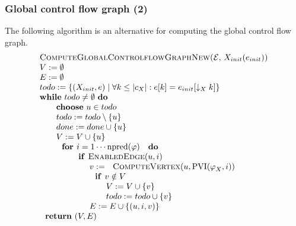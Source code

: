 \subsubsection{Global control flow graph (2)}

The following algorithm is an alternative for computing the global control
flow graph.%
\begin{equation*}
\begin{tabular}{l}
\textsc{ComputeGlobalControlflowGraphNew(}$\mathcal{E}$, $X_{init}(e_{init})$%
\textsc{)} \\ 
$V:=\emptyset $ \\ 
$E:=\emptyset $ \\ 
$todo:=\{(X_{init},e)\mid \forall k\leq \left\vert c_{X}\right\vert
:e[k]=e_{init}[\downarrow _{X}k]\}$ \\ 
\textbf{while} $todo\neq \emptyset $ \textbf{do} \\ 
$\qquad $\textbf{choose} $u\in todo$ \\ 
$\qquad todo:=todo\setminus \{u\}$ \\ 
$\qquad done:=done\cup \{u\}$ \\ 
$\qquad V:=V\cup \{u\}$ \\ 
$\qquad \text{\textbf{for }}i=1\cdots \mathrm{npred}(\varphi )\text{ \textbf{%
do}}$ \\ 
$\qquad \qquad \text{\textbf{if }\textsc{EnabledEdge}}(u,i)$ \\ 
$\qquad \qquad \qquad v:=\text{\textsc{ComputeVertex}}(u,\mathrm{PVI}%
(\varphi _{X},i))$ \\ 
$\qquad \qquad \qquad \text{\textbf{if }}v\notin V$ \\ 
$\qquad \qquad \qquad \qquad V:=V\cup \{v\}$ \\ 
$\qquad \qquad \qquad \qquad todo:=todo\cup \{v\}$ \\ 
$\qquad \qquad \qquad E:=E\cup \{(u,i,v)\}$ \\ 
$\text{\textbf{return} }(V,E)$%
\end{tabular}%
\end{equation*}

